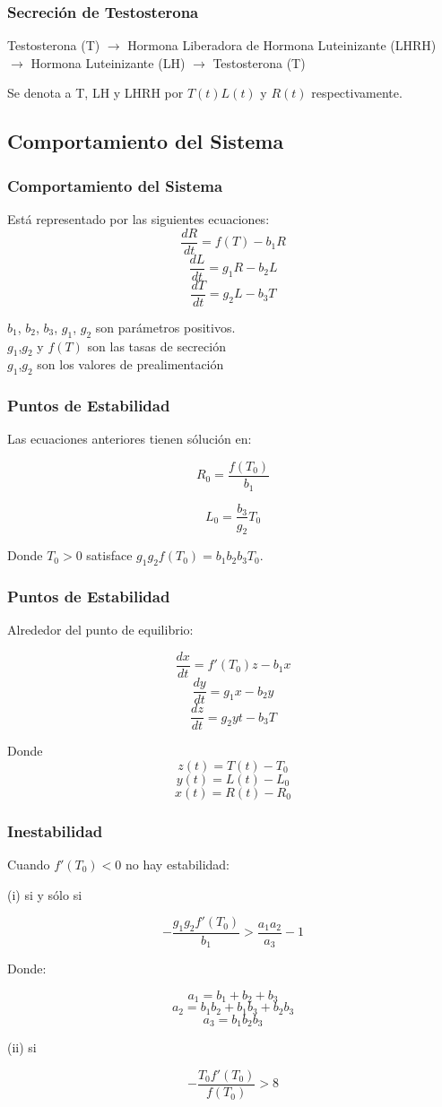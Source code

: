 \documentclass[10pt]{beamer}
\begin{document}
\begin{frame}
\frametitle{Secreción de Testosterona}
Testosterona (T) $\rightarrow$ Hormona Liberadora de Hormona Luteinizante (LHRH) $\rightarrow$ Hormona Luteinizante (LH) $\rightarrow$ Testosterona (T)

Se denota a T, LH y LHRH por $T(t) L(t)$ y $R(t)$ respectivamente.
\end{frame}

\subsection{Comportamiento del Sistema}
\begin{frame}
\frametitle{Comportamiento del Sistema}
\begin{block}{}
Está representado por las siguientes ecuaciones:
$$\frac{dR}{dt} = f(T)-b_{1}R$$
$$\frac{dL}{dt} = g_{1}R-b_{2}L$$
$$ \frac{dT}{dt} = g_{2}L-b_{3}T $$
\end{block}
\begin{block}{}
$b_{1}$, $b_{2}$, $b_{3}$, $g_{1}$, $g_{2}$ son parámetros positivos.\\
$g_{1}$,$g_{2}$ y $f(T)$ son las tasas de secreción\\
$g_{1}$,$g_{2}$ son los valores de prealimentación\\
\end{block}
\end{frame}

\begin{frame}
\frametitle{Puntos de Estabilidad}
Las ecuaciones anteriores tienen sólución en:

$$R_{0} = \frac{f(T_{0})}{b_{1}}$$

$$L_{0} = \frac{b_{3}}{g_{2}}T_{0}$$

Donde $T_{0}>0$ satisface $g_{1}g_{2}f(T_{0}) = b_{1}b_{2}b_{3}T_{0}.$
\end{frame}

\begin{frame}
\frametitle{Puntos de Estabilidad}
Alrededor del punto de equilibrio:

$$ \frac{dx}{dt} = f'(T_{0})z-b_{1}x$$
$$ \frac{dy}{dt} = g_{1}x-b_{2}y $$
$$ \frac{dz}{dt} = g_{2}yt-b_{3}T $$

Donde
$$ z(t)=T(t)-T_{0} $$
$$ y(t)=L(t)-L_{0} $$
$$ x(t)=R(t)-R_{0} $$
\end{frame}

\begin{frame}
\frametitle{Inestabilidad}
Cuando $f'(T_{0}) < 0$ no hay estabilidad: 

(i) si y sólo si 

$$-\frac{g_{1}g_{2}f'(T_{0})}{b_{1}} > \frac{a_{1}a_{2}}{a_{3}}-1$$

Donde:

$$a_{1} = b_{1}+b_{2}+b_{3}$$
$$a_{2}=b_{1}b_{2}+b_{1}b_{3}+b_{2}b_{3}$$
$$a_{3}=b_{1}b_{2}b_{3}$$

(ii) si 

$$-\frac{T_{0}f'(T_{0})}{f(T_{0})} > 8 $$
\end{frame}
\end{document}
